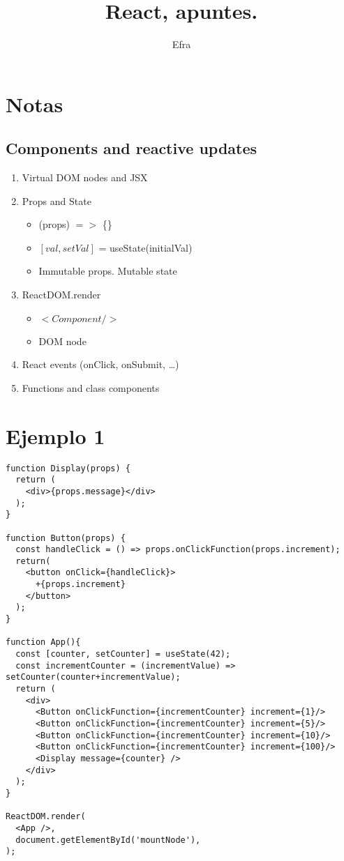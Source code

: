 \documentclass[10pt]{article} %
\title{React, apuntes.}
\author{Efra}
\begin{document}
\maketitle

\section{Notas}

\subsection{Components and reactive updates}
\begin{enumerate}
\item Virtual DOM nodes and JSX
\item Props and State
\begin{itemize}
\item (props) $=>$ \{\}
\item $[val, setVal]$ = useState(initialVal)
\item Immutable props. Mutable state
\end{itemize}
\item ReactDOM.render
\begin{itemize}
\item $<Component/>$
\item DOM node
\end{itemize}
\item React events (onClick, onSubmit, \dots)
\item Functions and class components
\end{enumerate}

\section{Ejemplo 1}
\begin{verbatim}
function Display(props) {
  return (
    <div>{props.message}</div>
  );
}

function Button(props) {
  const handleClick = () => props.onClickFunction(props.increment);
  return(
    <button onClick={handleClick}>
      +{props.increment}
    </button>
  );
}

function App(){
  const [counter, setCounter] = useState(42);
  const incrementCounter = (incrementValue) => setCounter(counter+incrementValue);
  return (
    <div>
      <Button onClickFunction={incrementCounter} increment={1}/>
      <Button onClickFunction={incrementCounter} increment={5}/>
      <Button onClickFunction={incrementCounter} increment={10}/>
      <Button onClickFunction={incrementCounter} increment={100}/>
      <Display message={counter} />
    </div>
  );
}

ReactDOM.render(
  <App />, 
  document.getElementById('mountNode'),
);
\end{verbatim}
\end{document}
